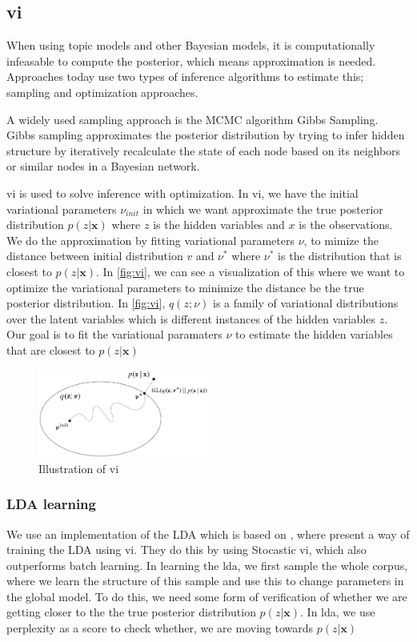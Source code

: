 \subsection{\gls{vi}}
When using topic models and other Bayesian models, it is computationally infeasable to compute the posterior, which means approximation is needed. 
Approaches today use two types of inference algorithms to estimate this; sampling and optimization approaches.

A widely used sampling approach is the MCMC algorithm Gibbs Sampling.
Gibbs sampling approximates the posterior distribution by trying to infer hidden structure by iteratively recalculate the state of each node based on its neighbors or similar nodes in a Bayesian network.

\gls{vi} is used to solve inference with optimization.
In \gls{vi}, we have the initial variational parameters $\nu_{init}$ in which we want approximate the true posterior distribution $p(z|\textbf{x})$ where $z$ is the hidden variables and $x$ is the observations.
We do the approximation by fitting variational parameters $\nu$, to mimize the distance between initial distribution $v$ and $\nu^*$ where $\nu^*$ is the distribution that is closest to $p(z|\textbf{x})$.
In \autoref{fig:vi}, we can see a visualization of this where we want to optimize the variational parameters to minimize the distance be the true posterior distribution.
In \autoref{fig:vi}, $q(z; \nu)$ is a family of variational distributions over the latent variables which is different instances of the hidden variables $z$.
Our goal is to fit the variational paramaters $\nu$ to estimate the hidden variables that are closest to $p(z|\textbf{x})$

\begin{figure}
	\centering
	\includegraphics[width=0.5\textwidth]{figures/vi_illustration.png}
	\caption[Caption for LOF]{Illustration of \acrlong{vi}\footnotemark}
	\label{fig:vi}
\end{figure}

\subsubsection*{LDA learning}
We use an implementation of the LDA which is based on \cite{blei2010online}, where \citeauthor{blei2010online} present a way of training the LDA using \gls{vi}.
They do this by using Stocastic \gls{vi}, which also outperforms batch learning.
In learning the \gls{lda}, we first sample the whole corpus, where we learn the structure of this sample and use this to change parameters in the global model.
To do this, we need some form of verification of whether we are getting closer to the the true posterior distribution $p(z|\textbf{x})$.
In \gls{lda}, we use perplexity as a score to check whether, we are moving towards $p(z|\textbf{x})$
